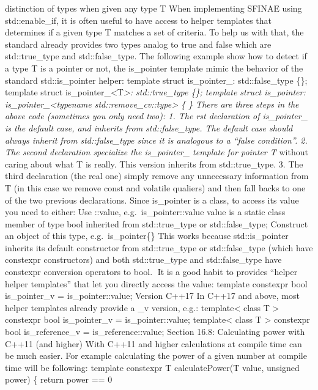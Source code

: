 distinction of types when given any type T When implementing SFINAE
using std::enable\_if, it is often useful to have access to helper
templates that determines if a given type T matches a set of criteria.
To help us with that, the standard already provides two types analog to
true and false which are std::true\_type and std::false\_type. The
following example show how to detect if a type T is a pointer or not,
the is\_pointer template mimic the behavior of the standard
std::is\_pointer helper: template struct is\_pointer\_: std::false\_type
\{\}; template struct is\_pointer\_\textless T\emph{\textgreater:
std::true\_type \{\}; template struct is\_pointer:
is\_pointer\_\textless typename std::remove\_cv::type\textgreater{} \{
\} There are three steps in the above code (sometimes you only need
two): 1. The rst declaration of is\_pointer\_ is the default case, and
inherits from std::false\_type. The default case should always inherit
from std::false\_type since it is analogous to a ``false condition''. 2.
The second declaration specialize the is\_pointer\_ template for pointer
T} without caring about what T is really. This version inherits from
std::true\_type. 3. The third declaration (the real one) simply remove
any unnecessary information from T (in this case we remove const and
volatile qualiers) and then fall backs to one of the two previous
declarations. Since is\_pointer is a class, to access its value you need
to either: Use ::value, e.g.~is\_pointer::value value is a static class
member of type bool inherited from std::true\_type or std::false\_type;
Construct an object of this type, e.g.~is\_pointer\{\} This works
because std::is\_pointer inherits its default constructor from
std::true\_type or std::false\_type (which have constexpr constructors)
and both std::true\_type and std::false\_type have constexpr conversion
operators to bool. It is a good habit to provides ``helper helper
templates'' that let you directly access the value: template constexpr
bool is\_pointer\_v = is\_pointer::value; Version C++17 In C++17 and
above, most helper templates already provide a \_v version, e.g.:
template\textless{} class T \textgreater{} constexpr bool is\_pointer\_v
= is\_pointer::value; template\textless{} class T \textgreater{}
constexpr bool is\_reference\_v = is\_reference::value; Section 16.8:
Calculating power with C++11 (and higher) With C++11 and higher
calculations at compile time can be much easier. For example calculating
the power of a given number at compile time will be following: template
constexpr T calculatePower(T value, unsigned power) \{ return power == 0
